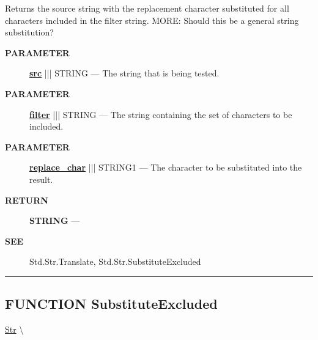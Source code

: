 \par





Returns the source string with the replacement character substituted for all characters included in the filter string. MORE: Should this be a general string substitution?






\par
\begin{description}
\item [\colorbox{tagtype}{\color{white} \textbf{\textsf{PARAMETER}}}] \textbf{\underline{src}} ||| STRING --- The string that is being tested.
\item [\colorbox{tagtype}{\color{white} \textbf{\textsf{PARAMETER}}}] \textbf{\underline{filter}} ||| STRING --- The string containing the set of characters to be included.
\item [\colorbox{tagtype}{\color{white} \textbf{\textsf{PARAMETER}}}] \textbf{\underline{replace\_char}} ||| STRING1 --- The character to be substituted into the result.
\end{description}







\par
\begin{description}
\item [\colorbox{tagtype}{\color{white} \textbf{\textsf{RETURN}}}] \textbf{STRING} --- 
\end{description}






\par
\begin{description}
\item [\colorbox{tagtype}{\color{white} \textbf{\textsf{SEE}}}] Std.Str.Translate, Std.Str.SubstituteExcluded
\end{description}




\rule{\linewidth}{0.5pt}
\subsection*{\textsf{\colorbox{headtoc}{\color{white} FUNCTION}
SubstituteExcluded}}

\hypertarget{ecldoc:str.substituteexcluded}{}
\hspace{0pt} \hyperlink{ecldoc:Str}{Str} \textbackslash 

